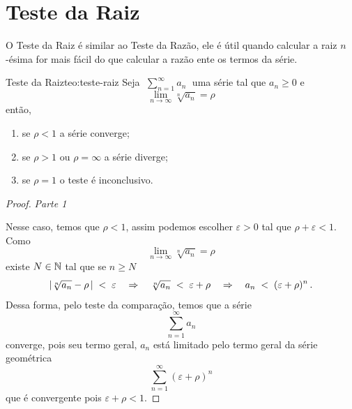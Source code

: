 \section{Teste da Raiz}

O Teste da Raiz é similar ao Teste da Razão, ele é útil quando calcular
a raiz $n$-ésima for mais fácil do que calcular a razão ente os termos da série.

\begin{teorema}{Teste da Raiz}{teo:teste-raiz}
  Seja
  \(\;
    \sum_{n=1}^\infty a_n
  \;\)
  uma série tal que $a_n\geq 0$ e
  \[
    \lim_{n\to \infty} \sqrt[n]{a_n} = \rho
  \]
  então,
  \begin{enumerate}
    \item se $\rho<1$ a série converge;
    \item se $\rho>1$ ou $\rho=\infty$ a série diverge;
    \item se $\rho=1$ o teste é inconclusivo.
  \end{enumerate}
\end{teorema}
\begin{proof}
  \emph{Parte 1}

  Nesse caso, temos que $\rho<1$, assim podemos escolher $\varepsilon>0$
  tal que $\rho+\varepsilon<1$.
  Como
  \[
    \lim_{n\to \infty} \sqrt[n]{a_n}=\rho
  \]
  existe $N\in \mathbb{N}$ tal que se $n\geq N$
  \[
      \abs{\sqrt[n]{a_n}-\rho\,}\;<\;\varepsilon
      \quad\Rightarrow\quad
      \sqrt[n]{a_n} \;<\; \varepsilon+\rho
      \quad\Rightarrow\quad
      a_n \;<\; (\varepsilon+\rho)^n      \,.
  \]
  Dessa forma, pelo teste da comparação, temos que a série
  \[
    \sum_{n=1}^\infty a_n
  \]
  converge, pois seu termo geral, $a_n$ está limitado pelo termo geral da série geométrica
  \[
    \sum_{n=1}^\infty (\varepsilon+\rho)^n
  \]
  que é convergente pois $\varepsilon+\rho<1$.

%

\end{proof}

